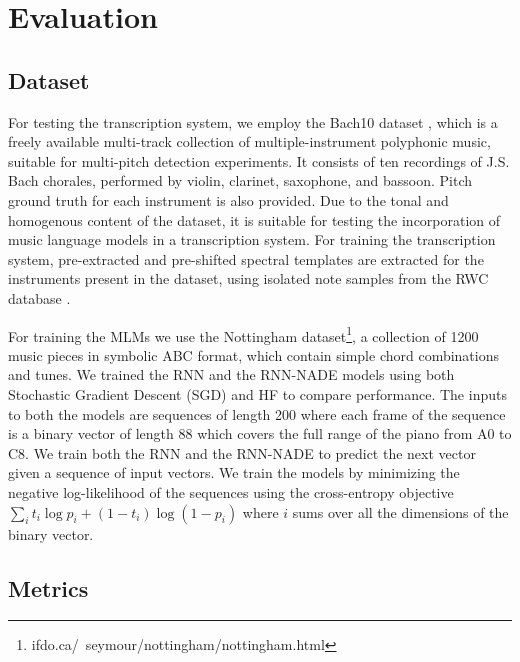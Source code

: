 \section{Evaluation} \label{sec:evaluation}

\subsection{Dataset}

For testing the transcription system, we employ the Bach10 dataset \cite{Duan2010}, which is a freely available multi-track collection of multiple-instrument polyphonic music, suitable for multi-pitch detection experiments. It consists of ten recordings of J.S. Bach chorales, performed by violin, clarinet, saxophone, and bassoon. Pitch ground truth for each instrument is also provided. Due to the tonal and homogenous content of the dataset, it is suitable for testing the incorporation of music language models in a transcription system. For training the transcription system, pre-extracted and pre-shifted spectral templates are extracted for the instruments present in the dataset, using isolated note samples from the RWC database \cite{Goto2003}. 

For training the MLMs we use the Nottingham dataset\footnote{ifdo.ca/~seymour/nottingham/nottingham.html}, a collection of 1200 music pieces in symbolic ABC format, which contain simple chord combinations and tunes. We trained the RNN and the RNN-NADE models using both Stochastic Gradient Descent (SGD) and HF to compare performance. The inputs to both the models are sequences of length 200 where each frame of the sequence is a binary vector of length 88 which covers the full range of the piano from A0 to C8. We train both the RNN and the RNN-NADE to predict the next vector given a sequence of input vectors. We train the models by minimizing the negative log-likelihood of the sequences using the cross-entropy objective $ \sum_{i}t_{i}\log p_{i} + (1 - t_{i})\log(1-p_{i})$ where $i$ sums over all the dimensions of the binary vector.


\subsection{Metrics}


